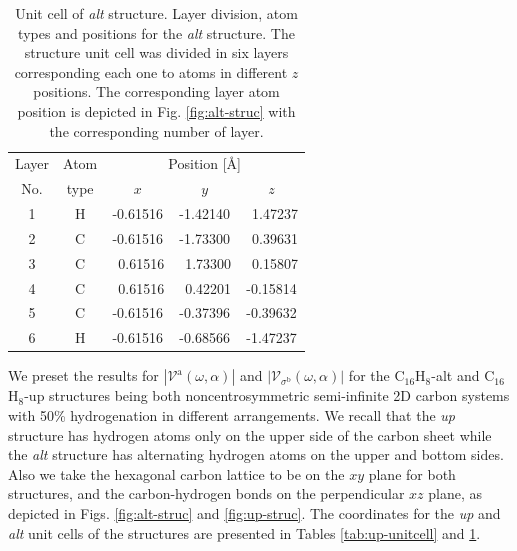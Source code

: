 \documentclass[prb,11pt,tightenlines,twocolumn,aps]{revtex4-1}
\begin{document}
\begin{table}[t]
\center
\begin{tabular}{ccccc}\\
\hline
\quad Layer \quad & \quad Atom \qquad & \multicolumn{3}{c}{Position [\AA]} \\
\cline{3-5}
\quad No.   \quad & \quad type \qquad & $x$ & $y$ & $z$  \\
\hline
1 & H &  -0.61516 &  -1.42140 & \ 1.47237 \\
2 & C &  -0.61516 &  -1.73300 & \ 0.39631 \\
3 & C & \ 0.61516 & \ 1.73300 & \ 0.15807 \\
4 & C & \ 0.61516 & \ 0.42201 &  -0.15814 \\
5 & C &  -0.61516 &  -0.37396 &  -0.39632 \\
6 & H &  -0.61516 &  -0.68566 &  -1.47237 \\
\hline
\end{tabular}

\caption{Unit cell of \emph{alt} structure. Layer division, atom types and
positions for the \emph{alt} structure. The structure unit cell was divided in
six layers corresponding each one to atoms in different $z$ positions. The
corresponding layer atom position is depicted in Fig. \ref{fig:alt-struc} with
the corresponding number of layer.}
\label{tab:alt-unitcell}
\end{table}

We preset the results for $|\mathcal{V}^{\mathrm{a}}(\omega,\alpha)|$ and
$|\mathcal{V}_{\sigma^{\mathrm{b}}}(\omega,\alpha)|$ for the
C$_{16}$H$_{8}$-alt and C$_{16}$H$_{8}$-up structures being both
noncentrosymmetric semi-infinite 2D carbon systems with 50\% hydrogenation in
different arrangements. We recall that the \emph{up} structure has hydrogen
atoms only on the upper side of the carbon sheet while the \emph{alt} structure
has alternating hydrogen atoms on the upper and bottom sides. Also we take the
hexagonal carbon lattice to be on the $xy$ plane for both structures, and the
carbon-hydrogen bonds on the perpendicular $xz$ plane, as depicted in Figs.
\ref{fig:alt-struc} and \ref{fig:up-struc}. The coordinates for the
\emph{up} and \emph{alt} unit cells of the structures are presented in Tables
\ref{tab:up-unitcell} and \ref{tab:alt-unitcell}. 
\end{document}
